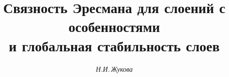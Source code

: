 









\newcommand{\id}{\operatorname{id}}


\newcommand{\tts}[1]{}







\setcounter{page}{45}















\author{\it Н.И.\,Жукова}




\title{Связность Эресмана для слоений с особенностями\\


и глобальная стабильность слоев}





\date{}




\pagestyle{plain} %







\maketitle


\label{begin}








